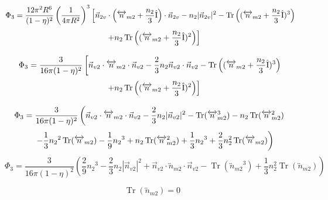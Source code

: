 \documentclass[letterpaper,twocolumn,amsmath,amssymb,prb]{revtex4-1}
\begin{document}
\begin{widetext}
\begin{displaymath}{\Phi_3=\frac{12\pi^2R^6}{(1-\eta)^2}\left(\frac{1}{4\pi{R}^2}\right)^3\left[\vec{n}_{2v}\cdot\left({\overleftrightarrow{n}_{m2}}+\frac{n_2}{3}\hat{\operatorname{I}}\right)\cdot\vec{n}_{2v}-n_2|\vec{n}_{2v}|^2-\operatorname{Tr}\left(({\overleftrightarrow{n}_{m2}}+\frac{n_2}{3}\hat{\operatorname{I}})^3\right)\color{white}\right]\color{black}}\end{displaymath}
\begin{equation}{\color{white}\left[\color{black}+n_2\operatorname{Tr}\left(({\overleftrightarrow{n}_{m2}}+\frac{n_2}{3}\hat{\operatorname{I}})^2\right)\right]}\end{equation}
\[{}\]
\begin{displaymath}{\Phi_3=\frac{3}{16\pi(1-\eta)^2}\left[\vec{n}_{v2}\cdot{\overleftrightarrow{n}_{m2}}\cdot{\vec{n}_{v2}}-\frac{2}{3}n_2\vec{n}_{v2}\cdot\vec{n}_{v2}-\operatorname{Tr}\left(({\overleftrightarrow{n}_{m2}}+\frac{n_2}{3}\hat{\operatorname{I}})^3\right)\color{white}\right]\color{black}}\end{displaymath}\begin{equation}{\color{white}\left[\color{black}+n_2\operatorname{Tr}\left((\overleftrightarrow{n}_{m2}+\frac{n_2}{3}\hat{\operatorname{I}})^2\right)\right]}\end{equation}
\[{}\]
\begin{displaymath}{\Phi_3=\frac{3}{16\pi(1-\eta)^2}\left(\vec{n}_{v2}\cdot{\overleftrightarrow{n}_{m2}}\cdot{\vec{n}_{v2}}-\frac{2}{3}n_2|\vec{n}_{v2}|^2-\operatorname{Tr}({\overleftrightarrow{n}_{m2}^3})
-n_2\operatorname{Tr}(\overleftrightarrow{n}_{m2}^2)\color{white}\right)\color{black}}\end{displaymath} \begin{equation}{\color{white}\left(\color{black}-\frac{1}{3}{n_2}^2\operatorname{Tr}(\overleftrightarrow{n}_{m2})-\frac{1}{9}{n_2}^3+n_2\operatorname{Tr}(\overleftrightarrow{n}_{m2}^2)+\frac{1}{3}{n_2}^3+\frac{2}{3}n^2_2\operatorname{Tr}(\overleftrightarrow{n}_{m2})\right)}\end{equation} 
\[{}\]
\begin{equation}{\Phi_3=\frac{3}{16\pi(1-\eta)^2}\left(\frac{2}{9}{n_2}^3-\frac{2}{3}n_2|\vec{n}_{v2}|^2+\vec{n}_{v2}\cdot{\overleftrightarrow{n}_{m2}}\cdot{\vec{n}_{v2}}-\operatorname{Tr}({\overleftrightarrow{n}_{m2}}^3)+\frac{1}{3}n^2_2\operatorname{Tr}(\overleftrightarrow{n}_{m2})\right)}\end{equation} 

\begin{equation}{\operatorname{Tr}(\overleftrightarrow{n}_{m2})=0}\end{equation} 


\end{widetext}
\end{document}
